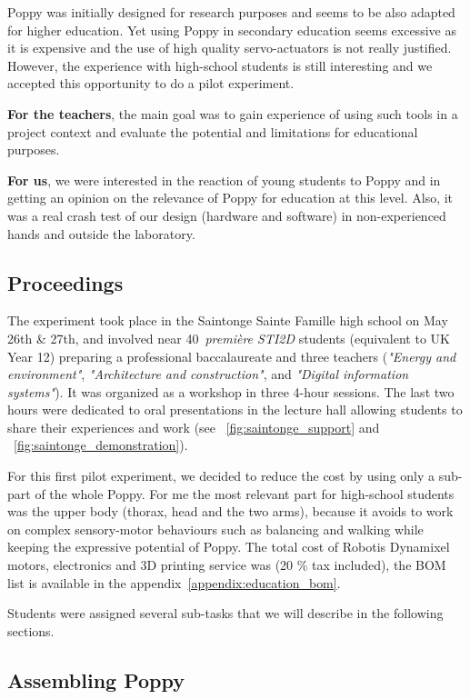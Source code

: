 Poppy was initially designed for research purposes and seems to be also adapted for higher education. Yet using Poppy in secondary education seems excessive as it is expensive and the use of high quality servo-actuators is not really justified. However, the experience with high-school students is still interesting and we accepted this opportunity to do a pilot experiment.

\textbf{For the teachers}, the main goal was to gain experience of using such tools in a project context and evaluate the potential and limitations for educational purposes.

\textbf{For us}, we were interested in the reaction of young students to Poppy and in getting an opinion on the relevance of Poppy for education at this level. Also, it was a real crash test of our design (hardware and software) in non-experienced hands and outside the laboratory.

\subsection{Proceedings} %

The experiment took place in the Saintonge Sainte Famille high school on May 26th \& 27th, and involved near 40~\emph{première STI2D} students (equivalent to UK Year 12) preparing a professional baccalaureate and three teachers (\emph{"Energy and environment"}, \emph{"Architecture and construction"}, and \emph{"Digital information systems"}).
It was organized as a workshop in three 4-hour sessions. The last two hours were dedicated to oral presentations in the lecture hall allowing students to share their experiences and work (see \figurename~\ref{fig:saintonge_support} and \figurename~\ref{fig:saintonge_demonstration}).

For this first pilot experiment, we decided to reduce the cost by using only a sub-part of the whole Poppy. For me the most relevant part for high-school students was the upper body (thorax, head and the two arms), because it avoids to work on complex sensory-motor behaviours such as balancing and walking while keeping the expressive potential of Poppy. The total cost of Robotis Dynamixel motors, electronics and 3D printing service was  (20 \% tax included), the BOM list is available in the appendix~\ref{appendix:education_bom}.


Students were assigned several sub-tasks that we will describe in the following sections.


\subsection{Assembling Poppy} %

